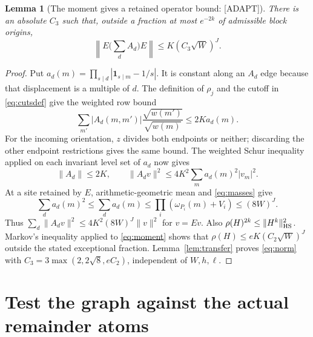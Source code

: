 \documentclass[11pt,a4paper]{article}
\numberwithin{equation}{section}
\newtheorem{lemma}[theorem]{Lemma}
\theoremstyle{remark}\newtheorem{remark}[theorem]{Remark}
\newcommand{\1}{\mathbf 1}
\begin{document}
\begin{lemma}[The moment gives a retained operator bound: {\rm[ADAPT]}]
\label{lem:norm}
There is an absolute $C_3$ such that, outside a fraction at most
$e^{-2k}$ of admissible block origins,
\begin{equation}\label{eq:norm}
 \left\|E\Big(\sum_d A_d\Big)E\right\|
 \le K(C_3\sqrt W)^J.
\end{equation}
\end{lemma}
\begin{proof}
Put $a_d(m)=\prod_{s\mid d}|\1_{s\mid m}-1/s|$.
It is constant along an $A_d$ edge because that displacement is a
multiple of $d$. The definition of $\rho_j$ and the cutoff in
\eqref{eq:cutsdef} give the weighted row bound
\begin{equation}\label{eq:row}
 \sum_{m'}|A_d(m,m')|\frac{\sqrt{w(m')}}{\sqrt{w(m)}}\le2K a_d(m).
\end{equation}
For the incoming orientation, $z$ divides both endpoints or neither;
discarding the other endpoint restrictions gives the same bound.
The weighted Schur inequality applied on each invariant level set of
$a_d$ now gives
\[
 \|A_d\|\le2K,\qquad
 \|A_dv\|^2\le4K^2\sum_m a_d(m)^2|v_m|^2.
\]
At a site retained by $E$, arithmetic-geometric mean and
\eqref{eq:masses} give
\[
 \sum_d a_d(m)^2\le\sum_d a_d(m)
 \le\prod_i(\omega_{P_i}(m)+V_i)
 \le(8W)^J.
\]
Thus $\sum_d\|A_dv\|^2\le4K^2(8W)^J\|v\|^2$ for $v=Ev$.
Also $\rho(H)^{2k}\le\|H^k\|_{\rm HS}^2$. Markov's inequality
applied to \eqref{eq:moment} shows that
$\rho(H)\le eK(C_2\sqrt W)^J$ outside the stated exceptional
fraction. Lemma~\ref{lem:transfer} proves \eqref{eq:norm} with
$C_3=3\max(2,2\sqrt8,eC_2)$, independent of $W,h,\ell$.
\end{proof}

\section{Test the graph against the actual remainder atoms}
\label{sec:testing}
\end{document}
